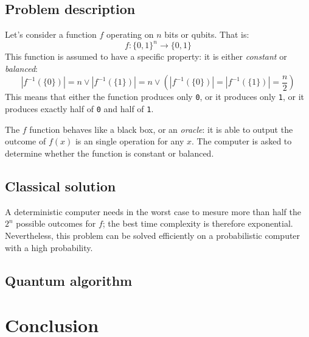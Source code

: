 \documentclass[12pt,a4paper]{article}
\theoremstyle{definition}
\begin{document}
\subsection{Problem description}
Let's consider a function $f$ operating on $n$ bits or qubits. That is:
\begin{equation*}
    f : \{ 0, 1 \}^n \to \{ 0, 1 \}
\end{equation*}
This function is assumed to have a specific property: it is either \emph{constant} or \emph{balanced}:
\begin{equation*}
    |f^{-1}(\{0\})| = n \lor |f^{-1}(\{1\})| = n \lor \left(|f^{-1}(\{0\})| = |f^{-1}(\{1\})| = \frac{n}{2}\right)
\end{equation*}
This means that either the function produces only \texttt{0}, or it produces only \texttt{1}, or it produces exactly half of \texttt{0} and half of \texttt{1}.

The $f$ function behaves like a black box, or an \emph{oracle}: it is able to output the outcome of $f(x)$ is an single operation for any $x$. The computer is asked to determine whether the function is constant or balanced.

\subsection{Classical solution}
A deterministic computer needs in the worst case to mesure more than half the $2^n$ possible outcomes for $f$; the best time complexity is therefore exponential. Nevertheless, this problem can be solved efficiently on a probabilistic computer with a high probability.

\subsection{Quantum algorithm}

\section*{Conclusion}

%
%
\end{document}
